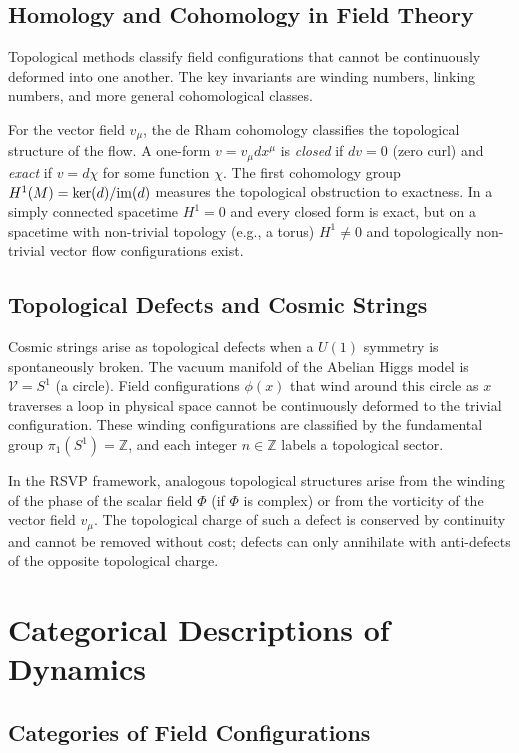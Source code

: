 \documentclass[12pt,a4paper,oneside]{book}
\theoremstyle{definition}
\theoremstyle{plain}
\theoremstyle{remark}
\begin{document}
\section{Homology and Cohomology in Field Theory}

Topological methods classify field configurations that cannot be continuously
deformed into one another. The key invariants are winding numbers, linking
numbers, and more general cohomological classes.

For the vector field $v_\mu$, the de Rham cohomology classifies the
topological structure of the flow. A one-form $v = v_\mu dx^\mu$ is
\emph{closed} if $dv = 0$ (zero curl) and \emph{exact} if $v = d\chi$ for
some function $\chi$. The first cohomology group $H^1(M) = \ker(d)/{\rm im}(d)$
measures the topological obstruction to exactness. In a simply connected
spacetime $H^1 = 0$ and every closed form is exact, but on a spacetime with
non-trivial topology (e.g., a torus) $H^1 \neq 0$ and topologically
non-trivial vector flow configurations exist.

\section{Topological Defects and Cosmic Strings}

Cosmic strings arise as topological defects when a $U(1)$ symmetry is
spontaneously broken. The vacuum manifold of the Abelian Higgs model is
$\mathcal{V} = S^1$ (a circle). Field configurations $\phi(x)$ that wind
around this circle as $x$ traverses a loop in physical space cannot be
continuously deformed to the trivial configuration. These winding
configurations are classified by the fundamental group $\pi_1(S^1) = \mathbb{Z}$,
and each integer $n \in \mathbb{Z}$ labels a topological sector.

In the RSVP framework, analogous topological structures arise from the
winding of the phase of the scalar field $\Phi$ (if $\Phi$ is complex) or
from the vorticity of the vector field $v_\mu$. The topological charge of
such a defect is conserved by continuity and cannot be removed without
cost; defects can only annihilate with anti-defects of the opposite
topological charge.

\chapter{Categorical Descriptions of Dynamics}

\section{Categories of Field Configurations}
\end{document}
